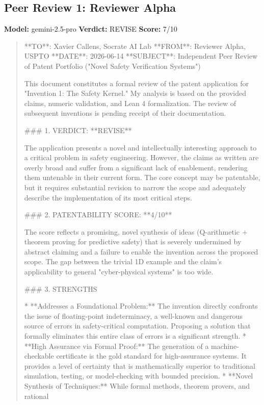 \documentclass{article}
\begin{document}
\begin{itemize}
\subsection{Peer Review 1: Reviewer Alpha}
\textbf{Model:} gemini-2.5-pro \quad \textbf{Verdict:} REVISE \quad \textbf{Score:} 7/10

\begin{quote}
**TO**: Xavier Callens, Socrate AI Lab
**FROM**: Reviewer Alpha, USPTO
**DATE**: 2026-06-14
**SUBJECT**: Independent Peer Review of Patent Portfolio ("Novel Safety Verification Systems")

This document constitutes a formal review of the patent application for "Invention 1: The Safety Kernel." My analysis is based on the provided claims, numeric validation, and Lean 4 formalization. The review of subsequent inventions is pending receipt of their documentation.

\#\#\# 1. VERDICT: **REVISE**

The application presents a novel and intellectually interesting approach to a critical problem in safety engineering. However, the claims as written are overly broad and suffer from a significant lack of enablement, rendering them untenable in their current form. The core concept may be patentable, but it requires substantial revision to narrow the scope and adequately describe the implementation of its most critical steps.

\#\#\# 2. PATENTABILITY SCORE: **4/10**

The score reflects a promising, novel synthesis of ideas (Q-arithmetic + theorem proving for predictive safety) that is severely undermined by abstract claiming and a failure to enable the invention across the proposed scope. The gap between the trivial 1D example and the claim's applicability to general "cyber-physical systems" is too wide.

\#\#\# 3. STRENGTHS

*   **Addresses a Foundational Problem:** The invention directly confronts the issue of floating-point indeterminacy, a well-known and dangerous source of errors in safety-critical computation. Proposing a solution that formally eliminates this entire class of errors is a significant strength.
*   **High Assurance via Formal Proof:** The generation of a machine-checkable certificate is the gold standard for high-assurance systems. It provides a level of certainty that is mathematically superior to traditional simulation, testing, or model-checking with bounded precision.
*   **Novel Synthesis of Techniques:** While formal methods, theorem provers, and rational
\end{quote}


\end{itemize}
\end{document}
